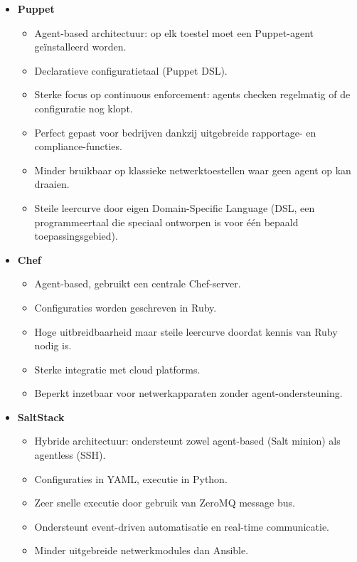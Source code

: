 \begin{itemize}

  \item \textbf{Puppet} \autocite{PuppetLabsDocs}  
        \begin{itemize}
          \item Agent-based architectuur: op elk toestel moet een Puppet-agent geïnstalleerd worden.
          \item Declaratieve configuratietaal (Puppet DSL).
          \item Sterke focus op continuous enforcement: agents checken regelmatig of de configuratie nog klopt.
          \item Perfect gepast voor bedrijven dankzij uitgebreide rapportage- en compliance-functies.
          \item Minder bruikbaar op klassieke netwerktoestellen waar geen agent op kan draaien.
          \item Steile leercurve door eigen Domain-Specific Language (DSL, een programmeertaal die speciaal ontworpen is voor één bepaald toepassingsgebied).
        \end{itemize}

  \item \textbf{Chef}  \autocite{ChefSoftwareDocs}
        \begin{itemize}
          \item Agent-based, gebruikt een centrale Chef-server.
          \item Configuraties worden geschreven in Ruby.
          \item Hoge uitbreidbaarheid maar steile leercurve doordat kennis van Ruby nodig is.
          \item Sterke integratie met cloud platforms.
          \item Beperkt inzetbaar voor netwerkapparaten zonder agent-ondersteuning.
        \end{itemize}

  \item \textbf{SaltStack} \autocite{SaltStackDocs}
        \begin{itemize}
          \item Hybride architectuur: ondersteunt zowel agent-based (Salt minion) als agentless (SSH).
          \item Configuraties in YAML, executie in Python.
          \item Zeer snelle executie door gebruik van ZeroMQ message bus.
          \item Ondersteunt event-driven automatisatie en real-time communicatie.
          \item Minder uitgebreide netwerkmodules dan Ansible.
        \end{itemize}


\end{itemize}
